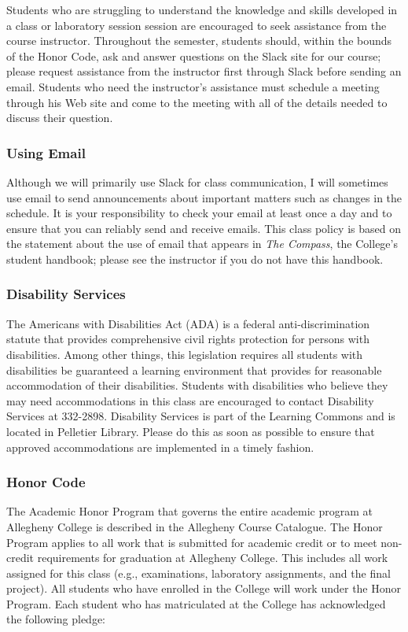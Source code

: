 Students who are struggling to understand the knowledge and skills developed in a class or laboratory session session
are encouraged to seek assistance from the course instructor. Throughout the semester, students should, within the
bounds of the Honor Code, ask and answer questions on the Slack site for our course; please request assistance from the
instructor first through Slack before sending an email. Students who need the instructor's assistance must schedule a
meeting through his Web site and come to the meeting with all of the details needed to discuss their question.

\subsubsection*{Using Email}

Although we will primarily use Slack for class communication, I will sometimes use email to send announcements about
important matters such as changes in the schedule. It is your responsibility to check your email at least once a day and to
ensure that you can reliably send and receive emails. This class policy is based on the statement about the use of email that
appears in {\em The Compass}, the College's student handbook; please see the instructor if you do not have this
handbook.

\subsubsection*{Disability Services}

The Americans with Disabilities Act (ADA) is a federal anti-discrimination statute that provides comprehensive civil
rights protection for persons with disabilities.  Among other things, this legislation requires all students with
disabilities be guaranteed a learning environment that provides for reasonable accommodation of their disabilities.
Students with disabilities who believe they may need accommodations in this class are encouraged to contact Disability
Services at 332-2898.  Disability Services is part of the Learning Commons and is located in Pelletier Library.
Please do this as soon as possible to ensure that approved accommodations are implemented in a timely fashion.

\subsubsection*{Honor Code}

The Academic Honor Program that governs the entire academic program at Allegheny College is described in the Allegheny
Course Catalogue.  The Honor Program applies to all work that is submitted for academic credit or to meet non-credit
requirements for graduation at Allegheny College.  This includes all work assigned for this class (e.g., examinations,
laboratory assignments, and the final project).  All students who have enrolled in the College will work under the Honor
Program.  Each student who has matriculated at the College has acknowledged the following pledge:

